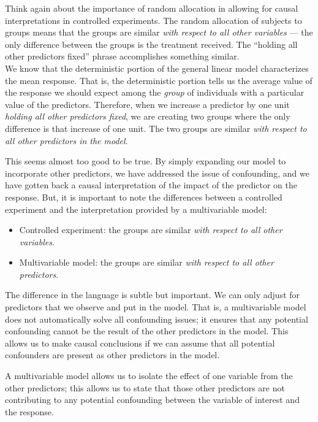 \documentclass[
  letterpaper,
  DIV=11,
  numbers=noendperiod]{scrreprt}
\providecommand{\tightlist}{%
  \setlength{\itemsep}{0pt}\setlength{\parskip}{0pt}}\usepackage{longtable,booktabs,array}
\theoremstyle{definition}
\theoremstyle{definition}
\theoremstyle{remark}
\begin{document}
Think again about the importance of random allocation in allowing for
causal interpretations in controlled experiments. The random allocation
of subjects to groups means that the groups are similar \emph{with
respect to all other variables} --- the only difference between the
groups is the treatment received. The ``holding all other predictors
fixed'' phrase accomplishes something similar.\\
We know that the deterministic portion of the general linear model
characterizes the mean response. That is, the deterministic portion
tells us the average value of the response we should expect among the
\emph{group} of individuals with a particular value of the predictors.
Therefore, when we increase a predictor by one unit \emph{holding all
other predictors fixed}, we are creating two groups where the only
difference is that increase of one unit. The two groups are similar
\emph{with respect to all other predictors in the model}.

This seems almost too good to be true. By simply expanding our model to
incorporate other predictors, we have addressed the issue of
confounding, and we have gotten back a causal interpretation of the
impact of the predictor on the response. But, it is important to note
the differences between a controlled experiment and the interpretation
provided by a multivariable model:

\begin{itemize}
\tightlist
\item
  Controlled experiment: the groups are similar \emph{with respect to
  all other variables}.
\item
  Multivariable model: the groups are similar \emph{with respect to all
  other predictors}.
\end{itemize}

The difference in the language is subtle but important. We can only
adjust for predictors that we observe and put in the model. That is, a
multivariable model does not automatically solve all confounding issues;
it ensures that any potential confounding cannot be the result of the
other predictors in the model. This allows us to make causal conclusions
if we can assume that all potential confounders are present as other
predictors in the model.

\begin{tcolorbox}[enhanced jigsaw, bottomrule=.15mm, titlerule=0mm, bottomtitle=1mm, colback=white, coltitle=black, rightrule=.15mm, leftrule=.75mm, toprule=.15mm, toptitle=1mm, left=2mm, opacityback=0, colframe=quarto-callout-tip-color-frame, breakable, title=\textcolor{quarto-callout-tip-color}{\faLightbulb}\hspace{0.5em}{Big Idea}, arc=.35mm, colbacktitle=quarto-callout-tip-color!10!white, opacitybacktitle=0.6]

A multivariable model allows us to isolate the effect of one variable
from the other predictors; this allows us to state that those other
predictors are not contributing to any potential confounding between the
variable of interest and the response.

\end{tcolorbox}
\end{document}
